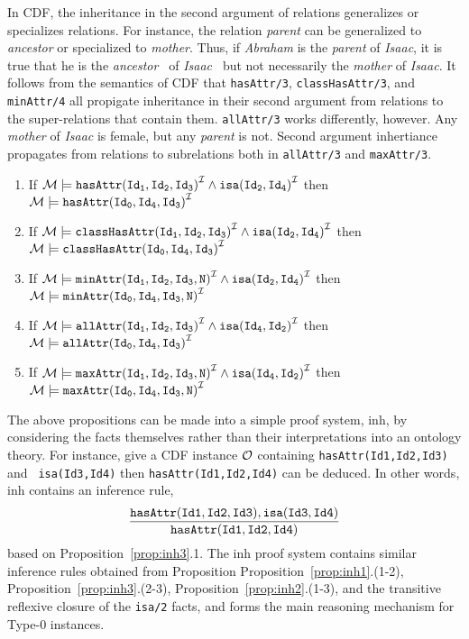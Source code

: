 In CDF, the inheritance in the second argument of relations
generalizes or specializes relations.  For instance, the relation {\it
parent} can be generalized to {\it ancestor} or specialized to {\it
mother}.  Thus, if {\it Abraham} is the {\it parent} of {\it Isaac},
it is true that he is the {\it ancestor\ } of {\it Isaac\ } but not
necessarily the {\it mother} of {\it Isaac}.  It follows from the
semantics of CDF that {\tt hasAttr/3}, {\tt classHasAttr/3}, and {\tt
minAttr/4} all propigate inheritance in their second argument from
relations to the super-relations that contain them.  {\tt allAttr/3}
works differently, however.  Any {\it mother} of {\it Isaac} is
female, but any {\it parent} is not.  Second argument inhertiance
propagates from relations to subrelations both in {\tt allAttr/3} and
{\tt maxAttr/3}.

\begin{proposition}
\label{prop:inh2} \rm 
\end{proposition} 
\begin{enumerate}
\item If ${\cal M} \models {\tt hasAttr(Id_1,Id_2,Id_3)}^{{\cal I}} \wedge
				{\tt isa(Id_2,Id_4)}^{{\cal I}}$ 
	then ${\cal M} \models {\tt hasAttr(Id_0,Id_4,Id_3)}^{{\cal I}} $ 
%
\item If ${\cal M} \models {\tt classHasAttr(Id_1,Id_2,Id_3)}^{{\cal I}} \wedge
				{\tt isa(Id_2,Id_4)}^{{\cal I}}$ 
	then ${\cal M} \models {\tt classHasAttr(Id_0,Id_4,Id_3)}^{{\cal I}} $ 
%
\item If ${\cal M} \models {\tt minAttr(Id_1,Id_2,Id_3,N)}^{{\cal I}} \wedge
				{\tt isa(Id_2,Id_4)}^{{\cal I}}$ 
	then ${\cal M} \models {\tt minAttr(Id_0,Id_4,Id_3,N)}^{{\cal I}} $ 
%
\item If ${\cal M} \models {\tt allAttr(Id_1,Id_2,Id_3)}^{{\cal I}} \wedge
				{\tt isa(Id_4,Id_2)}^{{\cal I}}$ 
	then ${\cal M} \models {\tt allAttr(Id_0,Id_4,Id_3)}^{{\cal I}} $ 
\item If ${\cal M} \models {\tt maxAttr(Id_1,Id_2,Id_3,N)}^{{\cal I}} \wedge
				{\tt isa(Id_4,Id_2)}^{{\cal I}}$ 
	then ${\cal M} \models {\tt maxAttr(Id_0,Id_4,Id_3,N)}^{{\cal I}} $ 
\end{enumerate}

The above propositions can be made into a simple proof system, {\sc
inh}, by considering the facts themselves rather than their
interpretations into an ontology theory.  For instance, give a CDF
instance ${\cal O}$ containing {\tt hasAttr(Id1,Id2,Id3)} and {\tt
isa(Id3,Id4)} then {\tt hasAttr(Id1,Id2,Id4)} can be deduced.  In
other words, {\sc inh} contains an inference rule,
\[
\frac{{\tt hasAttr(Id1,Id2,Id3)},{\tt isa(Id3,Id4)}}{{\tt hasAttr(Id1,Id2,Id4)}}
\]
based on Proposition~\ref{prop:inh3}.1.  The {\sc inh} proof system
contains similar inference rules obtained from Proposition
Proposition~\ref{prop:inh1}.(1-2), Proposition~\ref{prop:inh3}.(2-3),
Proposition~\ref{prop:inh2}.(1-3), and the transitive reflexive
closure of the {\tt isa/2} facts, and forms the main reasoning
mechanism for Type-0 instances.

